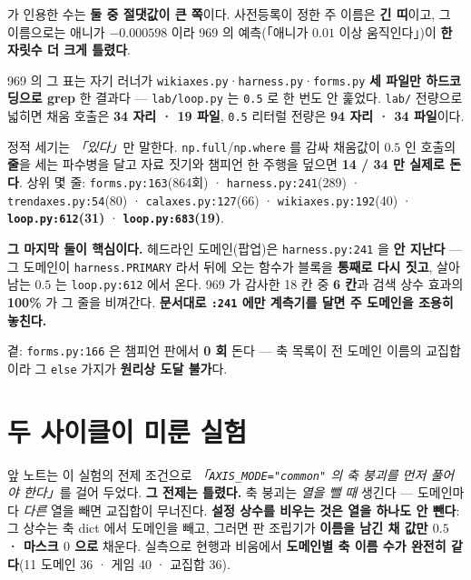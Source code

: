 \documentclass[10pt]{article}
\begin{document}
 가 인용한 수는 \textbf{둘 중 절댓값이 큰 쪽}이다. 사전등록이 정한 주 이름은
\textbf{긴 띠}이고, 그 이름으로는 애니가 $-0.000598$ 이라 969 의 예측(「애니가 $0.01$ 이상
움직인다」)이 \textbf{한 자릿수 더 크게 틀렸다}.


969 의 그 표는 자기 러너가 \texttt{wikiaxes.py}·\texttt{harness.py}·\texttt{forms.py}
\textbf{세 파일만 하드코딩으로 grep} 한 결과다 --- \texttt{lab/loop.py} 는 \texttt{0.5} 로
한 번도 안 훑었다. \texttt{lab/} 전량으로 넓히면 채움 호출은 \textbf{34 자리 ·
19 파일}, \texttt{0.5} 리터럴 전량은 \textbf{94 자리 · 34 파일}이다.

정적 세기는 \emph{「있다」}만 말한다. \texttt{np.full}/\texttt{np.where} 를 감싸
채움값이 $0.5$ 인 호출의 \textbf{줄}을 세는 파수병을 달고 자료 짓기와 챔피언 한 주행을
덮으면 \textbf{14 / 34 만 실제로 돈다}. 상위 몇 줄:
\texttt{forms.py:163}(864회) · \texttt{harness.py:241}(289) ·
\texttt{trendaxes.py:54}(80) · \texttt{calaxes.py:127}(66) · \texttt{wikiaxes.py:192}(40) ·
\textbf{\texttt{loop.py:612}(31)} · \textbf{\texttt{loop.py:683}(19)}.

\textbf{그 마지막 둘이 핵심이다.} 헤드라인 도메인(팝업)은 \texttt{harness.py:241} 을
\textbf{안 지난다} --- 그 도메인이 \texttt{harness.PRIMARY} 라서 뒤에 오는 함수가 블록을
\textbf{통째로 다시 짓고}, 살아남는 $0.5$ 는 \texttt{loop.py:612} 에서 온다. 969 가 감사한
18 칸 중 \textbf{6 칸}과 검색 상수 효과의 \textbf{100\%} 가 그 줄을 비껴간다.
\textbf{문서대로 \texttt{:241} 에만 계측기를 달면 주 도메인을 조용히 놓친다.}

곁: \texttt{forms.py:166} 은 챔피언 판에서 \textbf{0 회} 돈다 --- 축 목록이 전 도메인
이름의 교집합이라 그 \texttt{else} 가지가 \textbf{원리상 도달 불가}다.

\section{두 사이클이 미룬 실험}


앞 노트는 이 실험의 전제 조건으로 \emph{「\texttt{AXIS\_MODE="common"} 의 축 붕괴를 먼저
풀어야 한다」}를 걸어 두었다. \textbf{그 전제는 틀렸다.} 축 붕괴는 \emph{열을 뺄 때} 생긴다 ---
도메인마다 \emph{다른} 열을 빼면 교집합이 무너진다. \textbf{설정 상수를 비우는 것은 열을
하나도 안 뺀다}: 그 상수는 축 dict 에서 도메인을 빼고, 그러면 판 조립기가 \textbf{이름을
남긴 채 값만 $0.5$ · 마스크 $0$ 으로} 채운다. 실측으로 현행과 비움에서 \textbf{도메인별 축
이름 수가 완전히 같다}(11 도메인 36 · 게임 40 · 교집합 36).
\end{document}
